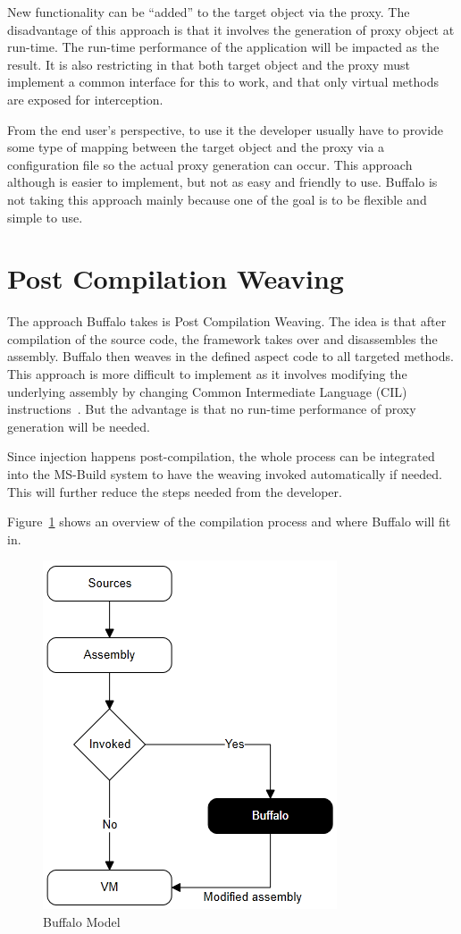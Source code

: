 New functionality can be “added” to the target object via the proxy. The disadvantage of this approach is that it involves the generation of proxy object at run-time. The run-time performance of the application will be impacted as the result. It is also restricting in that both target object and the proxy must implement a common interface for this to work, and that only virtual methods are exposed for interception.

From the end user's perspective, to use it the developer usually have to provide some type of mapping between the target object and the proxy via a configuration file so the actual proxy generation can occur. This approach although is easier to implement, but not as easy and friendly to use. Buffalo is not taking this approach mainly because one of the goal is to be flexible and simple to use.

\section{Post Compilation Weaving}

The approach Buffalo takes is Post Compilation Weaving. The idea is that after compilation of the source code, the framework takes over and disassembles the assembly. Buffalo then weaves in the defined aspect code to all targeted methods. This approach is more difficult to implement as it involves modifying the underlying assembly by changing Common Intermediate Language (CIL) instructions~\cite{rewrite_msil}. But the advantage is that no run-time performance of proxy generation will be needed. 

Since injection happens post-compilation, the whole process can be integrated into the MS-Build system to have the weaving invoked automatically if needed. This will further reduce the steps needed from the developer.

Figure~\ref{buffalo_model} shows an overview of the compilation process and where Buffalo will fit in.

\begin{figure}[H]
  \includegraphics[scale=1.0]{BuffaloOverview2.PNG}
  \centering
  \caption{Buffalo Model\label{buffalo_model}}
\end{figure}

